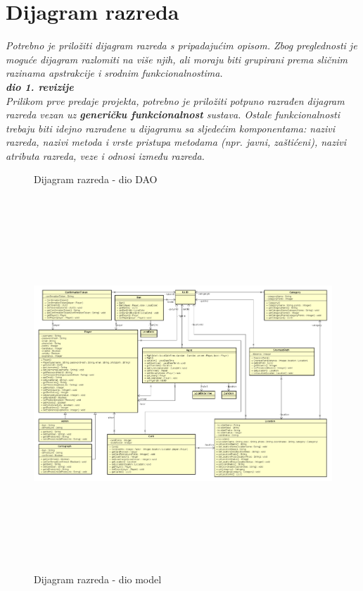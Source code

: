 			\eject
			
			
		\section{Dijagram razreda}
		
			\textit{Potrebno je priložiti dijagram razreda s pripadajućim opisom. Zbog preglednosti je moguće dijagram razlomiti na više njih, ali moraju biti grupirani prema sličnim razinama apstrakcije i srodnim funkcionalnostima.}\\
			
			\textbf{\textit{dio 1. revizije}}\\
			
			\textit{Prilikom prve predaje projekta, potrebno je priložiti potpuno razrađen dijagram razreda vezan uz \textbf{generičku funkcionalnost} sustava. Ostale funkcionalnosti trebaju biti idejno razrađene u dijagramu sa sljedećim komponentama: nazivi razreda, nazivi metoda i vrste pristupa metodama (npr. javni, zaštićeni), nazivi atributa razreda, veze i odnosi između razreda.}\\
			
			\begin{figure}[H]
				\centering
				\caption{Dijagram razreda - dio DAO}
				\label{}
			\end{figure}
		
			\begin{figure}[H]
				\includegraphics[width=\linewidth, height=14cm]{dijagrami/modelclass_diagram}				
				\centering
				\caption{Dijagram razreda - dio model}
				\label{}
			\end{figure}
		

